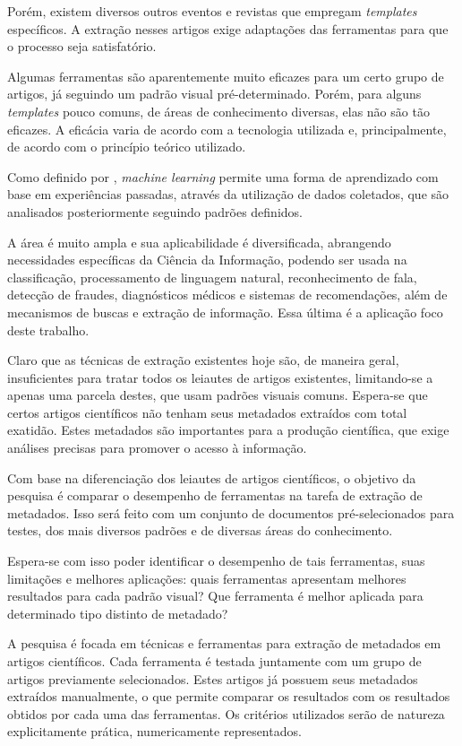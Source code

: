 Porém, existem diversos outros eventos e revistas que empregam \textit{templates} específicos. A extração nesses artigos exige adaptações das ferramentas para que o processo seja satisfatório.

Algumas ferramentas são aparentemente muito eficazes para um certo grupo de artigos, já seguindo um padrão visual pré-determinado. Porém, para alguns \textit{templates} pouco comuns, de áreas de conhecimento diversas, elas não são tão eficazes. A eficácia varia de acordo com a tecnologia utilizada e, principalmente, de acordo com o princípio teórico utilizado.

Como definido por \cite{foundations-machine-learning}, \textit{machine learning} permite uma forma de aprendizado com base em experiências passadas, através da utilização de dados coletados, que são analisados posteriormente seguindo padrões definidos.

A área é muito ampla e sua aplicabilidade é diversificada, abrangendo necessidades específicas da Ciência da Informação, podendo ser usada na classificação, processamento de linguagem natural, reconhecimento de fala, detecção de fraudes, diagnósticos médicos e sistemas de recomendações, além de mecanismos de buscas e extração de informação. Essa última é a aplicação foco deste trabalho.

Claro que as técnicas de extração existentes hoje são, de maneira geral, insuficientes para tratar todos os leiautes de artigos existentes, limitando-se a apenas uma parcela destes, que usam padrões visuais comuns. Espera-se que certos artigos científicos não tenham seus metadados extraídos com total exatidão. Estes metadados são importantes para a produção científica, que exige  análises precisas para promover o acesso à informação.

Com base na diferenciação dos leiautes de artigos científicos, o objetivo da pesquisa é comparar o desempenho de ferramentas na tarefa de extração de metadados. Isso será feito com um conjunto de documentos pré-selecionados para testes, dos mais diversos padrões e de diversas áreas do conhecimento.

Espera-se com isso poder identificar o desempenho de tais ferramentas, suas limitações e melhores aplicações: quais ferramentas apresentam melhores resultados para cada padrão visual? Que ferramenta é melhor aplicada para determinado tipo distinto de metadado?

A pesquisa é focada em técnicas e ferramentas para extração de metadados em artigos científicos. Cada ferramenta é testada juntamente com um grupo de artigos previamente selecionados. Estes artigos já possuem seus metadados extraídos manualmente, o que permite comparar os resultados com os resultados obtidos por cada uma das ferramentas. Os critérios utilizados serão de natureza explicitamente prática, numericamente representados.

